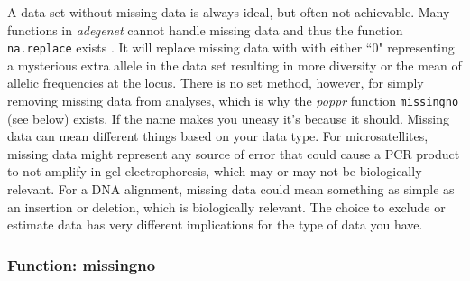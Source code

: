 \documentclass[letterpaper]{article}\usepackage[]{graphicx}\usepackage[]{color}
\newcommand{\tab}{\hspace*{1em}}
\begin{document}
\tab\tab A data set without missing data is always ideal, but often not achievable. Many functions in \textit{adegenet} cannot handle missing data and thus the function \texttt{na.replace} exists \cite{Jombart:2008}. It will replace missing data with with either ``0" representing a mysterious extra allele in the data set resulting in more diversity or the mean of allelic frequencies at the locus. There is no set method, however, for simply removing missing data from analyses, which is why the \textit{poppr} function \texttt{missingno} (see below) exists. If the name makes you uneasy it's because it should. Missing data can mean different things based on your data type. For microsatellites, missing data might represent any source of error that could cause a PCR product to not amplify in gel electrophoresis, which may or may not be biologically relevant. For a DNA alignment, missing data could mean something as simple as an insertion or deletion, which is biologically relevant. The choice to exclude or estimate data has very different implications for the type of data you have.
\subsubsection{Function: missingno}\label{data.manip:missing:missingno}
\end{document}
